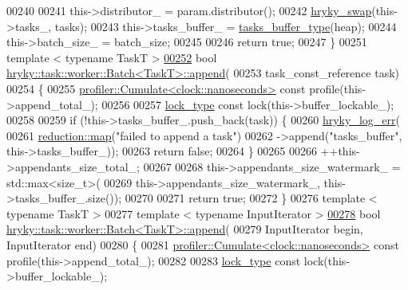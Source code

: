 \begin{DoxyCode}
00240 
00241     this->distributor\_ = param.distributor();
00242     \hyperlink{namespacehryky_add9c1c1fdfda07cd47bcb7c16d3a823a}{hryky_swap}(this->tasks\_, tasks);
00243     this->tasks\_buffer\_ = \hyperlink{classhryky_1_1_vector}{tasks_buffer_type}(heap);
00244     this->batch\_size\_ = batch\_size;
00245 
00246     \textcolor{keywordflow}{return} \textcolor{keyword}{true};
00247 \}
00251 \textcolor{keyword}{template} < \textcolor{keyword}{typename} TaskT >
\hypertarget{task__worker__batch_8h_source_l00252}{}\hyperlink{group__task_gaef74f2d2dd44b8e13f615963ea1e1f0f}{00252} \textcolor{keywordtype}{bool} \hyperlink{classhryky_1_1task_1_1worker_1_1_batch}{hryky::task::worker::Batch<TaskT>::append}(
00253     task\_const\_reference task)
00254 \{
00255     \hyperlink{classhryky_1_1profiler_1_1_cumulate}{profiler::Cumulate<clock::nanoseconds>} \textcolor{keyword}{const} profile(this->append\_total\_);
00256 
00257     \hyperlink{classhryky_1_1exclusion_1_1_lock}{lock_type} \textcolor{keyword}{const} lock(this->buffer\_lockable\_);
00258 
00259     \textcolor{keywordflow}{if} (!this->tasks\_buffer\_.push\_back(task)) \{
00260         \hyperlink{log__writer__common_8h_ae5ad3dabb33f594695ef40753cb78aad}{hryky_log_err}(
00261             \hyperlink{namespacehryky_1_1reduction_ac5eae270cf8047b294dc4ff3e5e11a79}{reduction::map}(\textcolor{stringliteral}{"failed to append a task"})
00262             ->append(\textcolor{stringliteral}{"tasks\_buffer"}, this->tasks\_buffer\_));
00263         \textcolor{keywordflow}{return} \textcolor{keyword}{false};
00264     \}
00265 
00266     ++this->appendants\_size\_total\_;
00267 
00268     this->appendants\_size\_watermark\_ = std::max<size\_t>(
00269         this->appendants\_size\_watermark\_, this->tasks\_buffer\_.size());
00270 
00271     \textcolor{keywordflow}{return} \textcolor{keyword}{true};
00272 \}
00276 \textcolor{keyword}{template} < \textcolor{keyword}{typename} TaskT >
00277 \textcolor{keyword}{template} < \textcolor{keyword}{typename} InputIterator >
\hypertarget{task__worker__batch_8h_source_l00278}{}\hyperlink{group__task_gabb7f26f7fde9cb631988f9cf906d499f}{00278} \textcolor{keywordtype}{bool} \hyperlink{classhryky_1_1task_1_1worker_1_1_batch}{hryky::task::worker::Batch<TaskT>::append}(
00279     InputIterator begin, InputIterator end)
00280 \{
00281     \hyperlink{classhryky_1_1profiler_1_1_cumulate}{profiler::Cumulate<clock::nanoseconds>} \textcolor{keyword}{const} profile(this->append\_total\_);
00282 
00283     \hyperlink{classhryky_1_1exclusion_1_1_lock}{lock_type} \textcolor{keyword}{const} lock(this->buffer\_lockable\_);

\end{DoxyCode}
